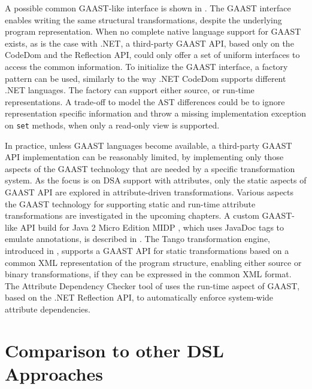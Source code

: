 A possible common GAAST-like interface is shown in . The GAAST interface enables writing the same structural transformations, despite the underlying program representation. When no complete native language support for GAAST exists, as is the case with .NET, a third-party GAAST API, based only on the CodeDom and the Reflection API, could only offer a set of uniform interfaces to access the common information. To initialize the GAAST interface, a factory pattern \cite{dpatterns} can be used, similarly to the way .NET CodeDom supports different .NET languages. The factory can support either source, or run-time representations. A trade-off to model the AST differences could be to ignore representation specific information and throw a missing implementation exception on \texttt{set} methods, when only a read-only view is supported.%

In practice, unless GAAST languages become available, a third-party GAAST API implementation can be reasonably limited, by implementing only those aspects of the GAAST technology that are needed by a specific transformation system. As the focus is on DSA support with attributes, only the static aspects of GAAST API are explored in attribute-driven transformations. Various aspects the GAAST technology for supporting static and run-time attribute transformations are investigated in the upcoming chapters. A custom GAAST-like API build for Java 2 Micro Edition MIDP \cite{www.midp}, which uses JavaDoc \cite{jw-pollac} tags to emulate annotations, is described in . The Tango transformation engine, introduced in , supports a GAAST API for static transformations based on a common XML representation of the program structure, enabling either source or binary transformations, if they can be expressed in the common XML format. The Attribute Dependency Checker tool of  uses the run-time aspect of GAAST, based on the .NET Reflection API, to automatically enforce system-wide attribute dependencies.

\section{Comparison to other DSL Approaches}
\label{sec.related.dsl}

